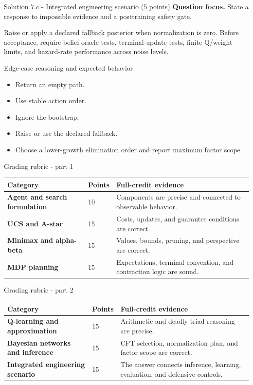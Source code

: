 \documentclass[aspectratio=169,11pt]{beamer}
\begin{document}
\begin{frame}{Solution 7.c - Integrated engineering scenario (5 points)}
\small
\textbf{Question focus.} State a response to impossible evidence and a posttraining safety gate.

\vspace{0.25cm}
\answerlabel Raise or apply a declared fallback posterior when normalization is zero. Before acceptance, require belief oracle tests, terminal-update tests, finite Q/weight limits, and hazard-rate performance across noise levels.
\end{frame}

\begin{frame}{Edge-case reasoning and expected behavior}
\small
\begin{itemize}
  \item Return an empty path.
  \item Use stable action order.
  \item Ignore the bootstrap.
  \item Raise or use the declared fallback.
  \item Choose a lower-growth elimination order and report maximum factor scope.
\end{itemize}
\end{frame}

\begin{frame}{Grading rubric - part 1}
\scriptsize
\begin{tabularx}{\textwidth}{>{\bfseries}p{} p{} X}
\toprule
Category & Points & Full-credit evidence \\
\midrule
Agent and search formulation & 10 & Components are precise and connected to observable behavior. \\
UCS and A-star & 15 & Costs, updates, and guarantee conditions are correct. \\
Minimax and alpha-beta & 15 & Values, bounds, pruning, and perspective are correct. \\
MDP planning & 15 & Expectations, terminal convention, and contraction logic are sound. \\
\bottomrule
\end{tabularx}
\end{frame}

\begin{frame}{Grading rubric - part 2}
\scriptsize
\begin{tabularx}{\textwidth}{>{\bfseries}p{} p{} X}
\toprule
Category & Points & Full-credit evidence \\
\midrule
Q-learning and approximation & 15 & Arithmetic and deadly-triad reasoning are precise. \\
Bayesian networks and inference & 15 & CPT selection, normalization plan, and factor scope are correct. \\
Integrated engineering scenario & 15 & The answer connects inference, learning, evaluation, and defensive controls. \\
\bottomrule
\end{tabularx}
\end{frame}
\end{document}
